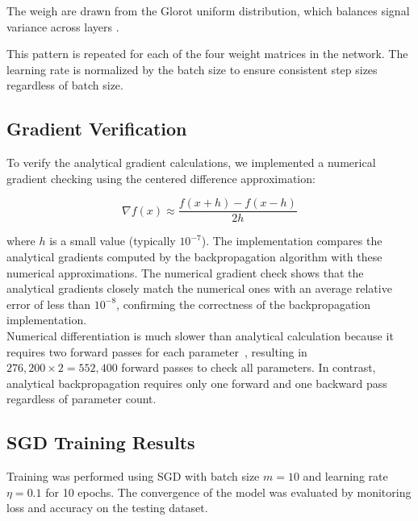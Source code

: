 \documentclass{article}
\begin{document}
\noindent The weigh are drawn from the Glorot uniform distribution, which balances signal
variance across layers \cite{glorot2010understanding}.

This pattern is repeated for each of the four weight 
matrices in the network. The learning rate is normalized by 
the batch size to ensure consistent step sizes regardless 
of batch size.

\subsection{Gradient Verification}

To verify the analytical gradient calculations, we implemented 
a numerical gradient checking using the centered difference 
approximation:

\begin{equation}
\nabla f(x) \approx \frac{f(x + h) - f(x - h)}{2h}
\end{equation}

\noindent where $h$ is a small value (typically $10^{-7}$). 
The implementation compares the analytical gradients computed 
by the backpropagation algorithm with these numerical approximations. 
The numerical gradient check shows that the analytical gradients closely 
match the numerical ones with an average relative error of less than $10^{-8}$, 
confirming the correctness of the backpropagation implementation. \\

\noindent Numerical differentiation is much slower than analytical calculation because 
it requires two forward passes for each parameter~\cite{goodfellow2016deep}, 
resulting in $276,200 \times 2 = 552,400$ forward passes to check all parameters. 
In contrast, analytical backpropagation requires only one forward and one backward 
pass regardless of parameter count.

\subsection{SGD Training Results}


\noindent Training was performed using SGD with batch size $m=10$ 
and learning rate $\eta=0.1$ for 10 epochs. The convergence 
of the model was evaluated by monitoring loss and accuracy 
on the testing dataset.
\end{document}
